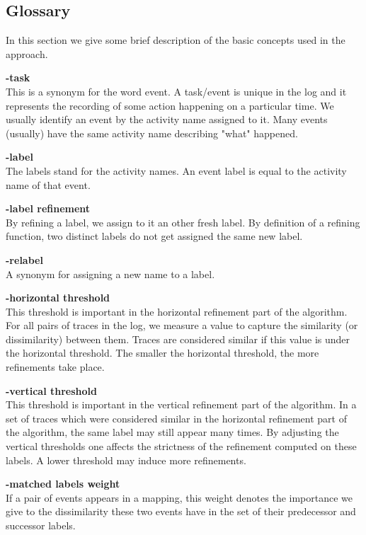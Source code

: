\documentclass[notitlepage]{article}
\begin{document}
\begin{flushleft}
\section{Glossary}
In this section we give some brief description of the basic concepts used in the approach.
\medskip

\textbf{-task}\\
This is a synonym for the word event.
A task/event is unique in the log and it represents the recording of some action happening on a particular time.
We usually identify an event by the activity name assigned to it.
Many events (usually) have the same activity name describing "what" happened.
\medskip

\textbf{-label}\\
The labels stand for the activity names.
An event label is equal to the activity name of that event.
\medskip

\textbf{-label refinement}\\
By refining a label, we assign to it an other fresh label.
By definition of a refining function, two distinct labels do not get assigned the same new label.
\medskip

\textbf{-relabel}\\
A synonym for assigning a new name to a label.
\medskip

\textbf{-horizontal threshold}\\
This threshold is important in the horizontal refinement part of the algorithm.
For all pairs of traces in the log, we measure a value to capture the similarity (or dissimilarity) between them.
Traces are considered similar if this value is under the horizontal threshold.
The smaller the horizontal threshold, the more refinements take place.
\medskip

\textbf{-vertical threshold}\\
This threshold is important in the vertical refinement part of the algorithm.
In a set of traces which were considered similar in the horizontal refinement part of the algorithm, the same label may still appear many times.
By adjusting the vertical thresholds one affects the strictness of the refinement computed on these labels.
A lower threshold may induce more refinements.
\medskip

\textbf{-matched labels weight}\\
If a pair of events appears in a mapping, this weight denotes the importance we give to the dissimilarity these two events have in the set of their predecessor and successor labels.
\medskip


\end{flushleft}
\end{document}
